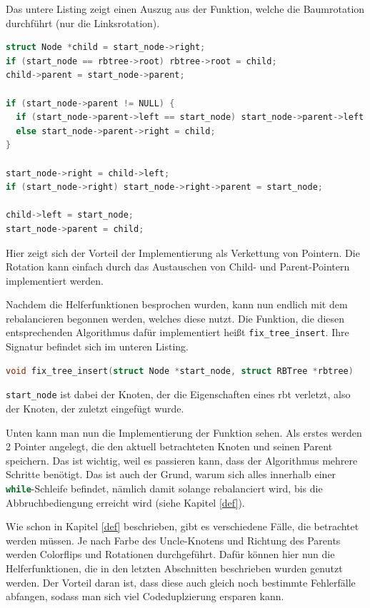 \documentclass[11pt]{article}
\newcommand{\lstin}[1]{\lstinline[language=C]{#1}}
\begin{document}
Das untere Listing zeigt einen Auszug aus der Funktion, welche die Baumrotation durchführt (nur die Linksrotation).

\begin{lstlisting}[language=C]
struct Node *child = start_node->right;
if (start_node == rbtree->root) rbtree->root = child;
child->parent = start_node->parent;

if (start_node->parent != NULL) {
  if (start_node->parent->left == start_node) start_node->parent->left = child;
  else start_node->parent->right = child;
}

start_node->right = child->left;
if (start_node->right) start_node->right->parent = start_node;

child->left = start_node;
start_node->parent = child;
\end{lstlisting}

Hier zeigt sich der Vorteil der Implementierung als Verkettung von Pointern. Die Rotation kann einfach durch das Austauschen von Child- und Parent-Pointern implementiert werden.

Nachdem die Helferfunktionen besprochen wurden, kann nun endlich mit dem rebalancieren begonnen werden, welches diese nutzt.
Die Funktion, die diesen entsprechenden Algorithmus dafür implementiert heißt \lstin{fix_tree_insert}. Ihre Signatur befindet sich im unteren Listing.

\begin{lstlisting}[language=C]
void fix_tree_insert(struct Node *start_node, struct RBTree *rbtree)
\end{lstlisting}

\lstin{start_node} ist dabei der Knoten, der die Eigenschaften eines \gls{rbt} verletzt, also der Knoten, der zuletzt eingefügt wurde.

Unten kann man nun die Implementierung der Funktion sehen.
Als erstes werden 2 Pointer angelegt, die den aktuell betrachteten Knoten und seinen Parent speichern.
Das ist wichtig, weil es passieren kann, dass der Algorithmus mehrere Schritte benötigt.
Das ist auch der Grund, warum sich alles innerhalb einer \lstin{while}-Schleife befindet, nämlich damit solange rebalanciert wird,
bis die Abbruchbediengung erreicht wird (siehe Kapitel \ref{def}).

Wie schon in Kapitel \ref{def} beschrieben, gibt es verschiedene Fälle, die betrachtet werden müssen.
Je nach Farbe des Uncle-Knotens und Richtung des Parents werden Colorflips und Rotationen durchgeführt.
Dafür können hier nun die Helferfunktionen, die in den letzten Abschnitten beschrieben wurden genutzt werden.
Der Vorteil daran ist, dass diese auch gleich noch bestimmte Fehlerfälle abfangen, sodass man sich viel Codeduplzierung ersparen kann.
\end{document}
